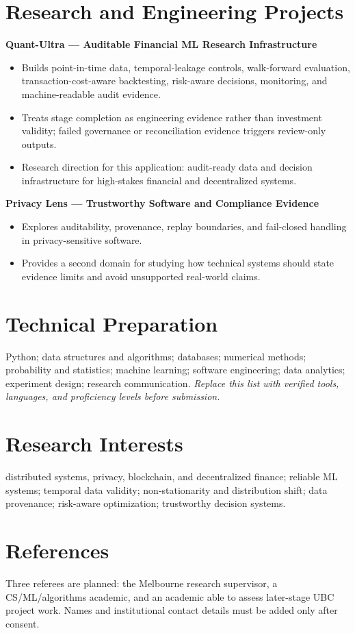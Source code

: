 \documentclass[11pt]{article}
\begin{document}
\section*{Research and Engineering Projects}
\textbf{Quant-Ultra --- Auditable Financial ML Research Infrastructure}
\begin{itemize}
\item Builds point-in-time data, temporal-leakage controls, walk-forward evaluation, transaction-cost-aware backtesting, risk-aware decisions, monitoring, and machine-readable audit evidence.
\item Treats stage completion as engineering evidence rather than investment validity; failed governance or reconciliation evidence triggers review-only outputs.
\item Research direction for this application: audit-ready data and decision infrastructure for high-stakes financial and decentralized systems.
\end{itemize}

\begin{samepage}
\textbf{Privacy Lens --- Trustworthy Software and Compliance Evidence}
\begin{itemize}
\item Explores auditability, provenance, replay boundaries, and fail-closed handling in privacy-sensitive software.
\item Provides a second domain for studying how technical systems should state evidence limits and avoid unsupported real-world claims.
\end{itemize}
\end{samepage}

\section*{Technical Preparation}
Python; data structures and algorithms; databases; numerical methods; probability and statistics; machine learning; software engineering; data analytics; experiment design; research communication. \textit{Replace this list with verified tools, languages, and proficiency levels before submission.}

\section*{Research Interests}
distributed systems, privacy, blockchain, and decentralized finance; reliable ML systems; temporal data validity; non-stationarity and distribution shift; data provenance; risk-aware optimization; trustworthy decision systems.

\section*{References}
Three referees are planned: the Melbourne research supervisor, a CS/ML/algorithms academic, and an academic able to assess later-stage UBC project work. Names and institutional contact details must be added only after consent.
\end{document}
